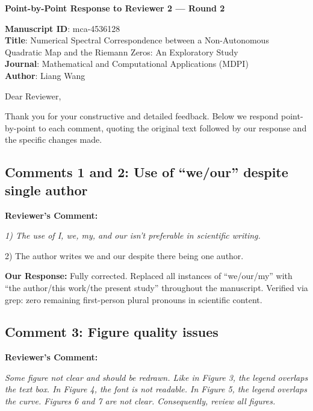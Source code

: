 \documentclass[11pt]{article}
\begin{document}
\begin{center}
\textbf{\Large Point-by-Point Response to Reviewer 2 --- Round 2}
\end{center}

\vspace{0.3cm}

\noindent \textbf{Manuscript ID}: mca-4536128\\
\textbf{Title}: Numerical Spectral Correspondence between a Non-Autonomous Quadratic Map and the Riemann Zeros: An Exploratory Study\\
\textbf{Journal}: Mathematical and Computational Applications (MDPI)\\
\textbf{Author}: Liang Wang

\vspace{0.5cm}

\noindent Dear Reviewer,

Thank you for your constructive and detailed feedback. Below we respond point-by-point to each comment, quoting the original text followed by our response and the specific changes made.

\subsection*{Comments 1 and 2: Use of ``we/our'' despite single author}

\noindent\textbf{Reviewer's Comment:}
\begin{quotebox}
\itshape 1) The use of I, we, my, and our isn't preferable in scientific writing.

2) The author writes we and our despite there being one author.
\end{quotebox}

\noindent\textbf{Our Response:} Fully corrected. Replaced all instances of ``we/our/my'' with ``the author/this work/the present study'' throughout the manuscript. Verified via grep: zero remaining first-person plural pronouns in scientific content.

\subsection*{Comment 3: Figure quality issues}

\noindent\textbf{Reviewer's Comment:}
\begin{quotebox}
\itshape Some figure not clear and should be redrawn. Like in Figure 3, the legend overlaps the text box. In Figure 4, the font is not readable. In Figure 5, the legend overlaps the curve. Figures 6 and 7 are not clear. Consequently, review all figures.
\end{quotebox}
\end{document}
